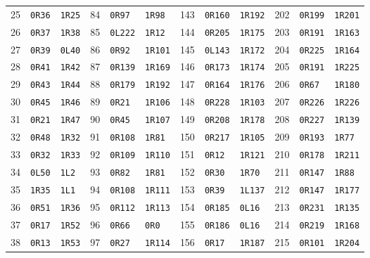 \begin{longtable}{rllrllrllrll}
25 & \texttt{0R36} & \texttt{1R25} & 84 & \texttt{0R97} & \texttt{1R98} & 143 & \texttt{0R160} & \texttt{1R192} & 202 & \texttt{0R199} & \texttt{1R201}\\
26 & \texttt{0R37} & \texttt{1R38} & 85 & \texttt{0L222} & \texttt{1R12} & 144 & \texttt{0R205} & \texttt{1R175} & 203 & \texttt{0R191} & \texttt{1R163}\\
27 & \texttt{0R39} & \texttt{0L40} & 86 & \texttt{0R92} & \texttt{1R101} & 145 & \texttt{0L143} & \texttt{1R172} & 204 & \texttt{0R225} & \texttt{1R164}\\
28 & \texttt{0R41} & \texttt{1R42} & 87 & \texttt{0R139} & \texttt{1R169} & 146 & \texttt{0R173} & \texttt{1R174} & 205 & \texttt{0R191} & \texttt{1R225}\\
29 & \texttt{0R43} & \texttt{1R44} & 88 & \texttt{0R179} & \texttt{1R192} & 147 & \texttt{0R164} & \texttt{1R176} & 206 & \texttt{0R67} & \texttt{1R180}\\
30 & \texttt{0R45} & \texttt{1R46} & 89 & \texttt{0R21} & \texttt{1R106} & 148 & \texttt{0R228} & \texttt{1R103} & 207 & \texttt{0R226} & \texttt{1R226}\\
31 & \texttt{0R21} & \texttt{1R47} & 90 & \texttt{0R45} & \texttt{1R107} & 149 & \texttt{0R208} & \texttt{1R178} & 208 & \texttt{0R227} & \texttt{1R139}\\
32 & \texttt{0R48} & \texttt{1R32} & 91 & \texttt{0R108} & \texttt{1R81} & 150 & \texttt{0R217} & \texttt{1R105} & 209 & \texttt{0R193} & \texttt{1R77}\\
33 & \texttt{0R32} & \texttt{1R33} & 92 & \texttt{0R109} & \texttt{1R110} & 151 & \texttt{0R12} & \texttt{1R121} & 210 & \texttt{0R178} & \texttt{1R211}\\
34 & \texttt{0L50} & \texttt{1L2} & 93 & \texttt{0R82} & \texttt{1R81} & 152 & \texttt{0R30} & \texttt{1R70} & 211 & \texttt{0R147} & \texttt{1R88}\\
35 & \texttt{1R35} & \texttt{1L1} & 94 & \texttt{0R108} & \texttt{1R111} & 153 & \texttt{0R39} & \texttt{1L137} & 212 & \texttt{0R147} & \texttt{1R177}\\
36 & \texttt{0R51} & \texttt{1R36} & 95 & \texttt{0R112} & \texttt{1R113} & 154 & \texttt{0R185} & \texttt{0L16} & 213 & \texttt{0R231} & \texttt{1R135}\\
37 & \texttt{0R17} & \texttt{1R52} & 96 & \texttt{0R66} & \texttt{0R0} & 155 & \texttt{0R186} & \texttt{0L16} & 214 & \texttt{0R219} & \texttt{1R168}\\
38 & \texttt{0R13} & \texttt{1R53} & 97 & \texttt{0R27} & \texttt{1R114} & 156 & \texttt{0R17} & \texttt{1R187} & 215 & \texttt{0R101} & \texttt{1R204}\\

\end{longtable}
